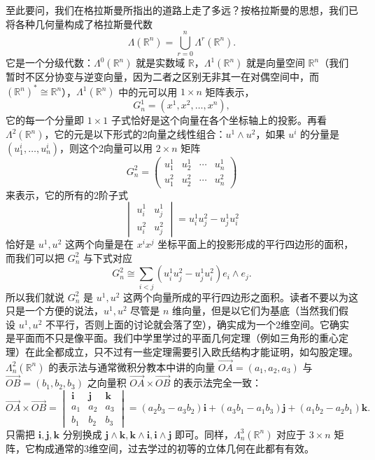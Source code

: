 至此要问，我们在格拉斯曼所指出的道路上走了多远？按格拉斯曼的思想，我们已将各种几何量构成了格拉斯曼代数
\[
 \Lambda(\mathbb R^n)=\bigcup_{r=0}^n\Lambda^r(\mathbb R^n).
\]
它是一个分级代数：$\Lambda^0(\mathbb R^n)$ 就是实数域 $\mathbb R$，$\Lambda^1(\mathbb R^n)$ 就是向量空间 $\mathbb R^n$（我们暂时不区分协变与逆变向量，因为二者之区别无非其一在对偶空间中，而 $(\mathbb R^n)^*\cong\mathbb R^n$），$\Lambda^1(\mathbb R^n)$ 中的元可以用 $1\times n$ 矩阵表示，
\[
 G_n^1=(x^1,x^2,\ldots,x^n),
\]
它的每一个分量即 $1\times1$ 子式恰好是这个向量在各个坐标轴上的投影。再看 $\Lambda^2(\mathbb R^n)$，它的元是以下形式的2向量之线性组合：$u^1\wedge u^2$，如果 $u^i$ 的分量是 $(u^i_1,\ldots,u^i_n)$，则这个2向量可以用 $2\times n$ 矩阵
\[
 G_n^2=\begin{pmatrix}
 u^1_1&u^1_2&\cdots&u^1_n\\
 u^2_1&u^2_2&\cdots&u^2_n
 \end{pmatrix}
\]
来表示，它的所有的2阶子式
\[
 \begin{vmatrix}u^1_i&u^1_j\\u^2_i&u^2_j\end{vmatrix}=u^1_iu^2_j-u^1_ju^2_i
\]
恰好是 $u^1,u^2$ 这两个向量是在 $x^ix^j$ 坐标平面上的投影形成的平行四边形的面积，而我们可以把 $G_n^2$ 与下式对应
\[
 G_n^2\cong\sum_{i<j}(u^1_iu^2_j-u^1_ju^2_i)e_i\wedge e_j.
\]
所以我们就说 $G_n^2$ 是 $u^1,u^2$ 这两个向量所成的平行四边形之面积。读者不要以为这只是一个方便的说法，$u^1,u^2$ 尽管是 $n$ 维向量，但是以它们为基底（当然我们假设 $u^1,u^2$ 不平行，否则上面的讨论就会落了空），确实成为一个2维空间。它确实是平面而不只是像平面。我们中学里学过的平面几何定理（例如三角形的重心定理）在此全都成立，只不过有一些定理需要引入欧氏结构才能证明，如勾股定理。$\Lambda^2_n(\mathbb R^n)$ 的表示法与通常微积分教本中讲的向量 $\overrightarrow{OA}=(a_1,a_2,a_3)$ 与 $\overrightarrow{OB}=(b_1,b_2,b_3)$ 之向量积 $\overrightarrow{OA}\times\overrightarrow{OB}$ 的表示法完全一致：
\[
 \overrightarrow{OA}\times\overrightarrow{OB}
 =\begin{vmatrix}\mathbf i&\mathbf j&\mathbf k\\a_1&a_2&a_3\\b_1&b_2&b_3\end{vmatrix}
 =(a_2b_3-a_3b_2)\mathbf i+(a_3b_1-a_1b_3)\mathbf j+(a_1b_2-a_2b_1)\mathbf k.
\]
只需把 $\mathbf i,\mathbf j,\mathbf k$ 分别换成 $\mathbf j\wedge\mathbf k,\mathbf k\wedge\mathbf i,\mathbf i\wedge\mathbf j$ 即可。同样，$\Lambda^3_n(\mathbb R^n)$ 对应于 $3\times n$ 矩阵，它构成通常的3维空间，过去学过的初等的立体几何在此都有有效。

